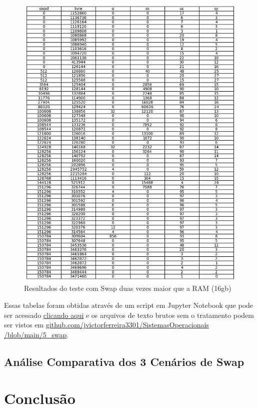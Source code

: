 \documentclass[
	12pt,				%
	openright,			%
	oneside,			%
	a4paper,			%
	chapter=TITLE,		%
	english,			%
	french,				%
	spanish,			%
	brazil				%
	]{abntex2}
\theoremstyle{definition}
\begin{document}
\begin{figure}[H]
	\centering
	\includegraphics[width=1.0\textwidth]{swap16gb.png}
	\caption{Resultados do teste com Swap duas vezes maior que a RAM (16gb)}
	\label{fig:swap16}
\end{figure}

Essas tabelas foram obtidas através de um script em Jupyter Notebook que pode ser acessado 
\href{https://github.com/jvictorferreira3301/Sistemas_Operacionais/blob/main/5_swap/swap.sh}{clicando aqui} 
e os arquivos de texto brutos sem o tratamento podem ser vistos em  \href{https://github.com/jvictorferreira3301/Sistemas_Operacionais/blob/main/5_swap}{github.com/jvictorferreira3301/SistemasOperacionais
/blob/main/5\_swap}.

\section{Análise Comparativa dos 3 Cenários de Swap}

\chapter{Conclusão}
\label{conclusao}
\end{document}
